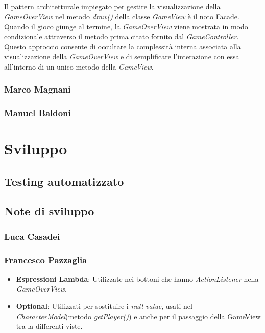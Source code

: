 \documentclass[a4paper,12pt]{report}
\begin{document}
Il pattern architetturale impiegato per gestire la visualizzazione della \textit{GameOverView} nel metodo \textit{draw()} della classe \textit{GameView} è il noto Facade.
Quando il gioco giunge al termine, la \textit{GameOverView} viene mostrata in modo condizionale attraverso il metodo prima citato fornito dal \textit{GameController}. Questo approccio consente di occultare la complessità interna associata alla visualizzazione della \textit{GameOverView} e di semplificare l'interazione con essa all'interno di un unico metodo della \textit{GameView}.

\subsection*{Marco Magnani}

\subsection*{Manuel Baldoni}


\chapter{Sviluppo}

\section{Testing automatizzato}
\section{Note di sviluppo}

\subsection*{Luca Casadei}
\subsection*{Francesco Pazzaglia}

\begin{itemize}
	\item \textbf{Espressioni Lambda}: Utilizzate nei bottoni che hanno \textit{ActionListener} nella \textit{GameOverView}.
	\item \textbf{Optional}: Utilizzati per sostituire i \textit{null value}, usati nel \textit{CharacterModel}(metodo \textit{getPlayer()}) e anche per il passaggio della GameView tra la differenti viste.
\end{itemize}
\end{document}
